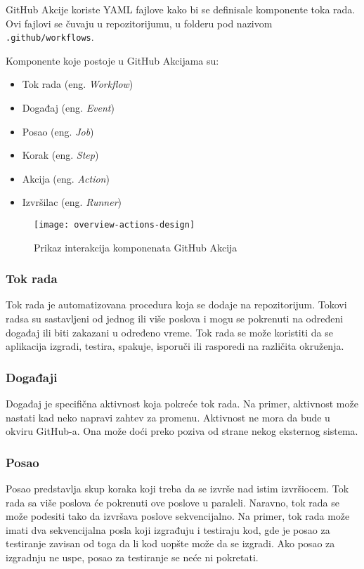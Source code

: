 GitHub Akcije koriste YAML fajlove kako bi se definisale komponente toka rada. Ovi fajlovi 
se čuvaju u repozitorijumu, u folderu pod nazivom \mbox{\texttt{.github/workflows}}.

Komponente koje postoje u GitHub Akcijama su: 

\begin{itemize}
    \item Tok rada (eng. \textit{Workflow})
    \item Događaj (eng. \textit{Event})
    \item Posao (eng. \textit{Job})
    \item Korak (eng. \textit{Step})
    \item Akcija (eng. \textit{Action})
    \item Izvršilac (eng. \textit{Runner})
\end{itemize}

\begin{figure}[h]
    \centering
    \texttt{[image: overview-actions-design]}
    \caption{Prikaz interakcija komponenata GitHub Akcija}
\end{figure}

\subsubsection{Tok rada}
Tok rada je automatizovana procedura koja se dodaje na repozitorijum. Tokovi radsa su sastavljeni 
od jednog ili više poslova i mogu se pokrenuti na određeni događaj ili biti zakazani u određeno vreme. 
Tok rada se može koristiti da se aplikacija izgradi, testira, spakuje, isporuči ili rasporedi na 
različita okruženja.

\subsubsection{Događaji}
Događaj je specifična aktivnost koja pokreće tok rada. Na primer, aktivnost može nastati kad neko napravi 
zahtev za promenu. Aktivnost ne mora da bude u okviru GitHub-a. Ona može doći preko poziva od strane 
nekog eksternog sistema.

\subsubsection{Posao}
Posao predstavlja skup koraka koji treba da se izvrše nad istim izvršiocem. Tok rada sa više poslova 
će pokrenuti ove poslove u paraleli. Naravno, tok rada se može podesiti tako da izvršava poslove 
sekvencijalno. Na primer, tok rada može imati dva sekvencijalna posla koji izgrađuju i testiraju kod, 
gde je posao za testiranje zavisan od toga da li kod uopšte može da se izgradi. Ako posao za izgradnju 
ne uspe, posao za testiranje se neće ni pokretati.


